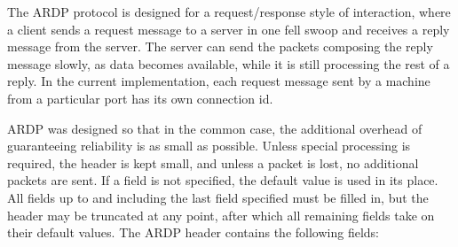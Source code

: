 The ARDP protocol is designed for a request/response style of
interaction, where a client sends a request message to a server in one
fell swoop and receives a reply message from the server.  The server
can send the packets composing the reply message slowly, as data
becomes available, while it is still processing the rest of a reply.
In the current implementation, each request message sent by a machine
from a particular port has its own connection id.

ARDP was designed so that in the common case, the additional overhead
of guaranteeing reliability is as small as possible.  Unless special
processing is required, the header is kept small, and unless a packet
is lost, no additional packets are sent.  If a field is not specified,
the default value is used in its place.  All fields up to and
including the last field specified must be filled in, but the header
may be truncated at any point, after which all remaining fields take
on their default values.  The ARDP header contains the following
fields:


